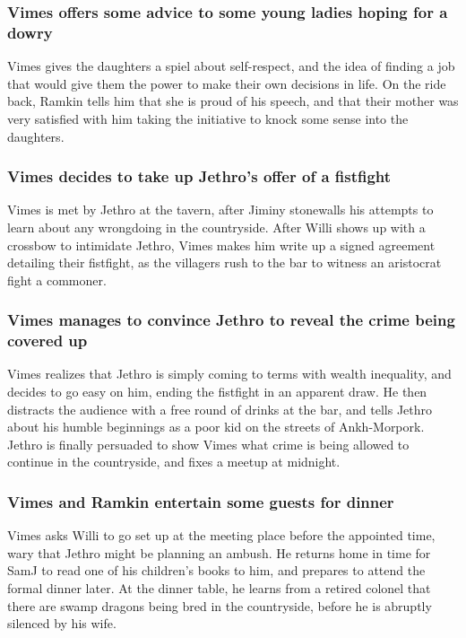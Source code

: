 \subsubsection{\Gls{Vimes} offers some advice to some young ladies hoping for a dowry}
\Gls{Vimes} gives the daughters a spiel about self-respect, and the idea of finding a job that would
give them the power to make their own decisions in life. On the ride back, \Gls{Ramkin} tells him
that she is proud of his speech, and that their mother was very satisfied with him taking the
initiative to knock some sense into the daughters.

\subsubsection{\Gls{Vimes} decides to take up \Gls{Jethro}'s offer of a fistfight}
\Gls{Vimes} is met by \Gls{Jethro} at the tavern, after \Gls{Jiminy} stonewalls his attempts to
learn about any wrongdoing in the countryside. After \Gls{Willi} shows up with a crossbow to
intimidate \Gls{Jethro}, \Gls{Vimes} makes him write up a signed agreement detailing their
fistfight, as the villagers rush to the bar to witness an aristocrat fight a commoner.

\subsubsection{\Gls{Vimes} manages to convince \Gls{Jethro} to reveal the crime being covered up}
\Gls{Vimes} realizes that \Gls{Jethro} is simply coming to terms with wealth inequality, and decides
to go easy on him, ending the fistfight in an apparent draw. He then distracts the audience with a
free round of drinks at the bar, and tells \Gls{Jethro} about his humble beginnings as a poor kid on
the streets of Ankh-Morpork. \Gls{Jethro} is finally persuaded to show \Gls{Vimes} what crime is
being allowed to continue in the countryside, and fixes a meetup at midnight.

\subsubsection{\Gls{Vimes} and \Gls{Ramkin} entertain some guests for dinner}
\Gls{Vimes} asks \Gls{Willi} to go set up at the meeting place before the appointed time, wary that
\Gls{Jethro} might be planning an ambush. He returns home in time for \Gls{SamJ} to read one of his
children's books to him, and prepares to attend the formal dinner later. At the dinner table,
he learns from a retired colonel that there are swamp dragons being bred in the countryside, before
he is abruptly silenced by his wife.

